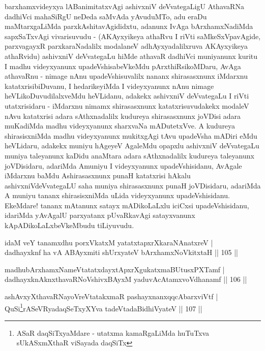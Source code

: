 \begin{artha}
barxhamxvideyxya lABanimitatxvAgi ashivxniV deVvategaLigU AthavaRNa
dadhiVci mahaSiRgU neDeda saMvAda yAvuduMTo, adu eraDu maMtarxgaLiMda
parxkAshitavAgididxtu, adanunx IvAga bArxhamxNadiMda sapxSaTxvAgi
vivarisuvudu - (AKAyxyikeya athaRvu I riVti saMkeSxVpavAgide,
parxvagayxR parxkaraNadalilx modalaneV adhAyxyadalilxruva AKAyxyikeya
athaRvidu)  ashivxniV deVvategaLu hiMde athavaR dadhiVci muniyanunx
kuritu I madhu videyxyanunx upadeVshisabeVkeMdu pArxthiRsikoMDaru,
AvAga athavaRnu - nimage nAnu upadeVshisuvalilx nananx shirasasxnunx
iMdarxnu katatxrisibiDuvanu, I hedarikeyiMda I videyxyanunx nAnu
nimage heVLikoDuvudilalxveMdu heVLidanu, adakekx ashivxniV deVvategaLu
I riVti utatxrisidaru - iMdarxnu nimamx shirasasxnunx
katatxrisuvudakekx modaleV nAvu katatxrisi adara sAthxnadalilx
kudureya shirasasxnunx joVDisi adara muKadiMda madhu videyxyanunx
sharxvaNa mADutetxVve. A kudureya shirasisxniMda madhu videyxyanunx
mukitxgAgi tAvu upadeVsha mADiri eMdu heVLidaru, adakekx muniyu
hAgeyeV AgaleMdu opapxlu ashivxniV deVvategaLu muniya taleyanunx
kaDidu anaMtara adara sAthxnadalilx kudureya taleyanunx joVDisidaru,
adariMda Amuniyu I videyxyanunx upadeVshisidanu, AvAgale iMdarxnu
baMdu Ashirasasxnunx punaH katatxrisi hAkalu ashivxniVdeVvategaLU saha
muniya shirasasxnunx punaH joVDisidaru, adariMda  A muniyu tananx
shirasisxniMda uLida videyxyanunx upadeVshisidanu. EkeMdare! tananx
mAtanunx satayx mADikoLaLxlu iciCxsi upadeVshisidanu, idariMda
yAvAgalU parxyatanx pUvaRkavAgi satayxvanunx kApADikoLaLxbeVkeMbudu
tiLiyuvudu.
\end{artha}


\begin{shl}
idaM veY tanamxdhu porxVkatxM yatatxtapxrXkaraNAnatxreV |\\
dadhayxknf ha vA ABAyxmiti shUrxyateV bArxhamxNoVkitxtaH \hfill || 105 ||
\end{shl}
\begin{shl}
madhubArxhamxNameVtatatxdayxtApxrXgukatxmaBUtusxPXTamf |\\
dadhayxknAknxthavaRNoV\s shivxBAyxM yaduvAcA\s \s tamxvoVdhanamf \hfill || 106 ||
\end{shl}


\begin{shl}
ashAvxyXthavaRNayoVreVtatakxmaR pashayxnanxqqcA\s barxviVtf |\\
QuSi\footnote{ASaR daqSiTxyaMdare - utatxma kamaRgaLiMda huTuTxva sUkASxmXthaR viSayada daqSiTx}rASeVRyadaqSeTxyXYva tadeVtadaBidhiVyateV \hfill || 107 || 
\end{shl}


